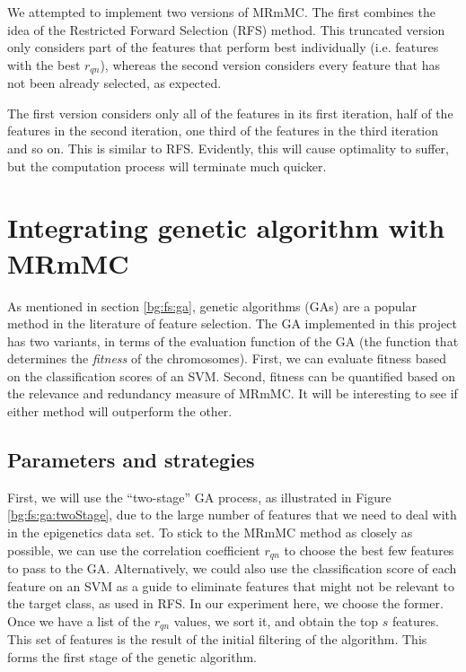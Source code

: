 \documentclass[12pt, twoside, a4paper]{report}
\begin{document}
We attempted to implement two versions of MRmMC. The first combines the idea of the Restricted Forward Selection (RFS) method. This truncated version only considers part of the features that perform best individually (i.e. features with the best $r_{qn}$), whereas the second version considers every feature that has not been already selected, as expected.

The first version considers only all of the features in its first iteration, half of the features in the second iteration, one third of the features in the third iteration and so on. This is similar to RFS. Evidently, this will cause optimality to suffer, but the computation process will terminate much quicker.


\section{Integrating genetic algorithm with MRmMC} \label{ga:mrmmc}

As mentioned in section \ref{bg:fs:ga}, genetic algorithms (GAs) are a popular method in the literature of feature selection. The GA implemented in this project has two variants, in terms of the evaluation function of the GA (the function that determines the \textit{fitness} of the chromosomes). First, we can evaluate fitness based on the classification scores of an SVM. Second, fitness can be quantified based on the relevance and redundancy measure of MRmMC. It will be interesting to see if either method will outperform the other.

\subsection{Parameters and strategies}
\label{body:ga:params}

First, we will use the ``two-stage'' GA process, as illustrated in Figure \ref{bg:fs:ga:twoStage}, due to the large number of features that we need to deal with in the epigenetics data set. To stick to the MRmMC method as closely as possible, we can use the correlation coefficient $r_{qn}$ to choose the best few features to pass to the GA. Alternatively, we could also use the classification score of each feature on an SVM as a guide to eliminate features that might not be relevant to the target class, as used in RFS. In our experiment here, we choose the former. Once we have a list of the $r_{qn}$ values, we sort it, and obtain the top $s$ features. This set of features is the result of the initial filtering of the algorithm. This forms the first stage of the genetic algorithm.
\end{document}
